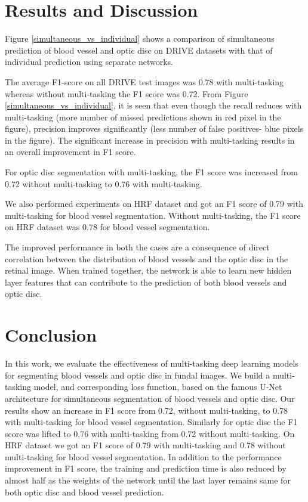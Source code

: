 \section{Results and Discussion}
Figure \ref{simultaneous_vs_individual} shows a comparison of  simultaneous prediction of blood vessel and optic disc on DRIVE  datasets with that of individual prediction using separate networks.

The average F1-score on all DRIVE test images was 0.78 with multi-tasking whereas without multi-tasking the F1 score was 0.72.
From Figure \ref{simultaneous_vs_individual}, it is seen that even though the recall reduces with multi-tasking (more number of missed predictions shown in red pixel in the figure), precision improves significantly (less number of false positives- blue pixels in the figure).
The significant increase in precision with multi-tasking results in an overall improvement in F1 score.

For optic disc segmentation with multi-tasking, the F1 score was increased from 0.72 without multi-tasking to 0.76 with multi-tasking.

We also performed experiments on HRF dataset and got an F1 score of 0.79 with multi-tasking for blood vessel segmentation.
Without multi-tasking, the F1 score on HRF dataset was 0.78 for blood vessel segmentation.

The improved performance in both the cases are a consequence of direct correlation between the distribution of blood vessels and the optic disc in the retinal image.
When trained together, the network is able to learn new hidden layer features that can contribute to the prediction of both blood vessels and optic disc.

\section{Conclusion}
In this work, we evaluate the effectiveness of multi-tasking deep learning models for segmenting blood vessels and optic disc in fundal images.
We build a multi-tasking model, and corresponding loss function,  based on the famous U-Net architecture for simultaneous  segmentation of blood vessels and optic disc.
Our results show an increase in F1 score from 0.72, without multi-tasking, to 0.78 with multi-tasking for blood vessel segmentation.
Similarly for optic disc the F1 score was lifted to 0.76 with multi-tasking from 0.72 without multi-tasking.
On HRF dataset we got an F1 score of 0.79 with multi-tasking and 0.78 without multi-tasking for blood vessel segmentation.
In addition to the performance improvement in F1 score, the training and prediction time is also reduced by almost half as the weights of the network until the last layer remains same for both optic disc and blood vessel prediction.